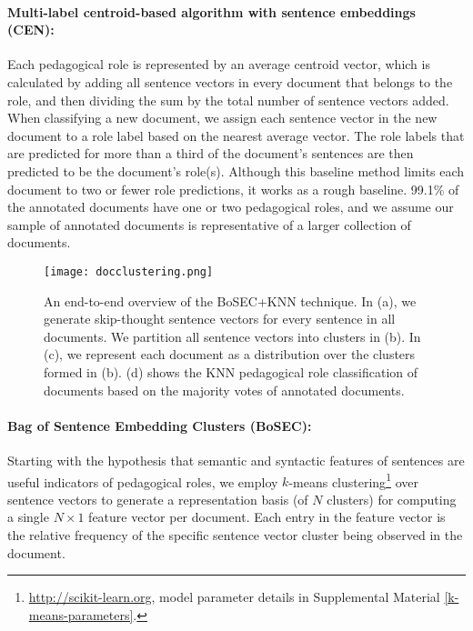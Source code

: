 \documentclass[11pt,a4paper]{article}
\begin{document}
\paragraph{Multi-label centroid-based algorithm with sentence embeddings (CEN):} Each pedagogical role is represented by an average centroid vector, which is calculated by adding all sentence vectors in every document that belongs to the role, and then dividing the sum by the total number of sentence vectors added. When classifying a new document, we assign each sentence vector in the new document to a role label based on the nearest average vector. The role labels that are predicted for more than a third of the document's sentences are then predicted to be the document's role(s). Although this baseline method limits each document to two or fewer role predictions, it works as a rough baseline. 99.1\% of the annotated documents have one or two pedagogical roles, and we assume our sample of annotated documents is representative of a larger collection of documents.

\begin{figure*}[!ht]
 \texttt{[image: docclustering.png]}

  \begin{minipage}[t]{0.15\linewidth}
    \centering
    \subcaption{}\label{sentencevectors}
  \end{minipage}
  \begin{minipage}[t]{.25\linewidth}
    \centering
    \subcaption{}\label{sentenceclustering}
  \end{minipage}
  \begin{minipage}[t]{.27\linewidth}
    \centering
    \subcaption{}\label{clusterdistribution}
  \end{minipage}
  \begin{minipage}[t]{.3\linewidth}
    \centering
    \subcaption{}\label{knn}
  \end{minipage}

  \caption{An end-to-end overview of the BoSEC+KNN technique. In (a), we generate skip-thought sentence vectors for every sentence in all documents. We partition all sentence vectors into clusters in (b). In (c), we represent each document as a distribution over the clusters formed in (b). (d) shows the KNN pedagogical role classification of documents based on the majority votes of annotated documents.}
  \label{fig:docclustering}
\end{figure*}

\paragraph{Bag of Sentence Embedding Clusters (BoSEC):} Starting with the hypothesis that semantic and syntactic features of sentences are useful indicators of pedagogical roles, we employ $k$-means clustering\footnote{\url{http://scikit-learn.org}, model parameter details in Supplemental Material \ref{k-means-parameters}.} over sentence vectors to generate a representation basis (of $N$ clusters) for computing a single $N \times 1$ feature vector per document. Each entry in the feature vector is the relative frequency of the specific sentence vector cluster being observed in the document.
\end{document}
